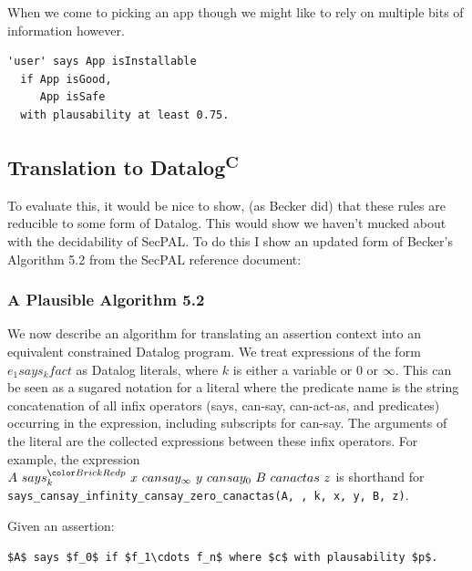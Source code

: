 \documentclass[thesis.tex]{subfiles}
\begin{document}
When we come to picking an app though we might like to rely on
multiple bits of information however.

\begin{lstlisting}
'user' says App isInstallable
  if App isGood,
     App isSafe
  with plausability at least 0.75.
\end{lstlisting}

\subsection{Translation to Datalog\textsuperscript{C}}

To evaluate this, it would be nice to show, (as Becker did) that these
rules are reducible to some form of Datalog.  This would show we
haven't mucked about with the decidability of SecPAL.  To do this I
show an updated form of Becker's Algorithm 5.2 from the SecPAL
reference document:

\subsubsection{A Plausible Algorithm 5.2}

We now describe an algorithm for translating an assertion context into
an equivalent constrained Datalog program. We treat expressions of the
form $e_1 says_k fact$ as Datalog literals, where $k$ is either a
variable or 0 or $\infty$. This can be seen as a sugared notation for
a literal where the predicate name is the string concatenation of all
infix operators (\textsf{says}, \textsf{can-say}, \textsf{can-act-as},
and predicates) occurring in the expression, including subscripts for
\textsf{can-say}. The arguments of the literal are the collected
expressions between these infix operators. For example, the expression
$A~says_k^{\new{p}}~x~can say_\infty~y~can say_0~B~can act as~z$ is
shorthand for
\texttt{says\_cansay\_infinity\_cansay\_zero\_canactas(A, , k,
x, y, B, z)}.

Given an assertion: 

\begin{center} \lstinline!$A$ says $f_0$ if $f_1\cdots f_n$ where $c$ with plausability $p$.! \end{center}
\end{document}
